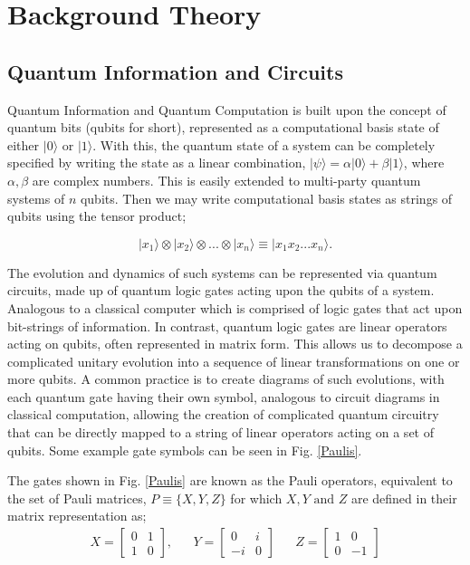 \section{Background Theory}
\subsection{Quantum Information and Circuits}
\vspace{-0.15in}
Quantum Information and Quantum Computation is built upon the concept of quantum bits (qubits for short),
represented as a computational basis state of either $|0\rangle$ or $|1\rangle$. With this, the
quantum state of a system can be completely specified by writing the state as a linear combination,
$|\psi\rangle = \alpha |0\rangle + \beta |1\rangle$, where $\alpha, \beta$ are complex numbers.
This is easily extended to multi-party quantum systems of $n$ qubits. Then we may write computational
basis states as strings of qubits using the tensor product;

\[|x_1\rangle \otimes |x_2\rangle \otimes ... \otimes |x_n\rangle \equiv |x_1 x_2... x_n \rangle. \]

The evolution and dynamics of such systems can be represented via quantum circuits, made up of quantum logic gates acting
upon the qubits of a system. Analogous to a classical computer which is comprised of logic gates that act upon
bit-strings of information. In contrast, quantum logic gates are linear operators acting
on qubits, often represented in matrix form. This allows us to decompose a complicated unitary evolution into a
sequence of linear transformations on one or more qubits. A common practice is to create
diagrams of such evolutions, with each quantum gate having their own symbol, analogous to circuit diagrams in classical
computation, allowing the creation of complicated quantum circuitry that can be directly mapped to a string of linear
operators acting on a set of qubits. Some example gate symbols can be seen in Fig. \ref{Paulis}.




The gates shown in Fig. \ref{Paulis} are known as the Pauli operators, equivalent
to the set of Pauli matrices, $P \equiv \{X, Y, Z\}$ for which $X, Y \text{ and } Z$ are defined in their matrix representation as;
\begin{align}
    \label{PauliMatrices}
    X = \begin{bmatrix}
            0 & 1 \\
            1 & 0
        \end{bmatrix},
     &  &
    Y = \begin{bmatrix}
            0  & i \\
            -i & 0
        \end{bmatrix}
     &  &
    Z = \begin{bmatrix}
            1 & 0  \\
            0 & -1
        \end{bmatrix}
\end{align}

